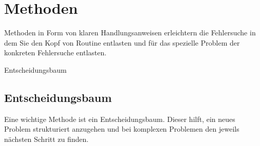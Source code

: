 \chapter{Methoden}
\label{cha:methoden}

\begin{abstractsec}
  Methoden in Form von klaren Handlungsanweisen erleichtern die Fehlersuche in
  dem Sie den Kopf von Routine entlasten und für das spezielle Problem der
  konkreten Fehlersuche entlasten.
\end{abstractsec}

\begin{notes}
\item Entscheidungsbaum
\end{notes}

\section{Entscheidungsbaum}
\label{sec:entscheidungsbaum}

\begin{abstractsec}
  Eine wichtige Methode ist ein Entscheidungsbaum. Dieser hilft, ein neues
  Problem strukturiert anzugehen und bei komplexen Problemen den jeweils
  nächsten Schritt zu finden.
\end{abstractsec}

